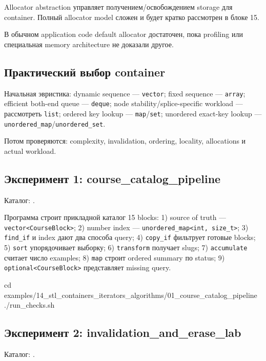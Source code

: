 Allocator abstraction управляет получением/освобождением storage для container.
Полный allocator model сложен и будет кратко рассмотрен в блоке 15.

В обычном application code default allocator достаточен, пока profiling или
специальная memory architecture не доказали другое.

\subsection{Практический выбор container}

Начальная эвристика:
dynamic sequence --- \texttt{vector}; fixed sequence --- \texttt{array}; efficient both-end queue --- \texttt{deque}; node stability/splice-specific workload --- рассмотреть \texttt{list}; ordered key lookup --- \texttt{map}/\texttt{set}; unordered exact-key lookup --- \texttt{unordered\_map}/\texttt{unordered\_set}.

Потом проверяются:
complexity, invalidation, ordering, locality, allocations и actual workload.

\subsection{Эксперимент 1: course\_catalog\_pipeline}

Каталог:
.

Программа строит прикладной каталог 15 blocks:
1) source of truth --- \texttt{vector<CourseBlock>}; 2) number index --- \texttt{unordered\_map<int, size\_t>}; 3) \texttt{find\_if} и index дают два способа query; 4) \texttt{copy\_if} фильтрует готовые blocks; 5) \texttt{sort} упорядочивает выборку; 6) \texttt{transform} получает slugs; 7) \texttt{accumulate} считает число examples; 8) \texttt{map} строит ordered summary по status; 9) \texttt{optional<CourseBlock>} представляет missing query.

\begin{shellcode}
cd examples/14_stl_containers_iterators_algorithms/01_course_catalog_pipeline
./run_checks.sh
\end{shellcode}

\subsection{Эксперимент 2: invalidation\_and\_erase\_lab}

Каталог:
.

